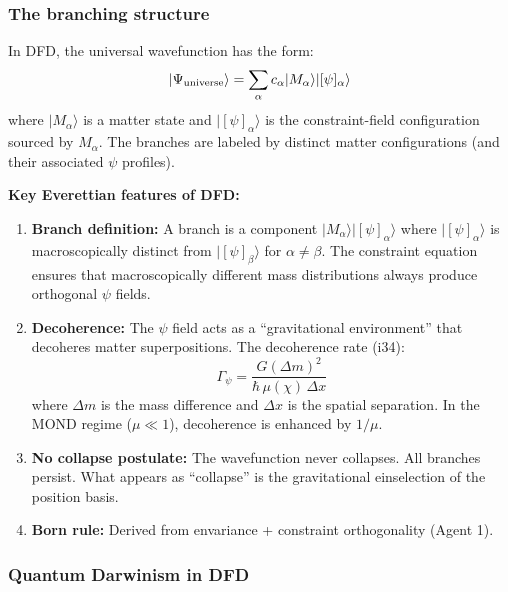 \documentclass[11pt,a4paper]{article}
\begin{document}
\subsubsection{The branching structure}

In DFD, the universal wavefunction has the form:
\begin{equation}
|\Psi_{\rm universe}\rangle = \sum_\alpha c_\alpha |M_\alpha\rangle |[\psi]_\alpha\rangle
\end{equation}
where $|M_\alpha\rangle$ is a matter state and $|[\psi]_\alpha\rangle$ is the constraint-field configuration sourced by $M_\alpha$. The branches are labeled by distinct matter configurations (and their associated $\psi$ profiles).

\textbf{Key Everettian features of DFD:}

\begin{enumerate}
\item \textbf{Branch definition:} A branch is a component $|M_\alpha\rangle|[\psi]_\alpha\rangle$ where $|[\psi]_\alpha\rangle$ is macroscopically distinct from $|[\psi]_\beta\rangle$ for $\alpha \neq \beta$. The constraint equation ensures that macroscopically different mass distributions always produce orthogonal $\psi$ fields.

\item \textbf{Decoherence:} The $\psi$ field acts as a ``gravitational environment'' that decoheres matter superpositions. The decoherence rate (i34):
\begin{equation}
\Gamma_\psi = \frac{G(\Delta m)^2}{\hbar\,\mu(\chi)\,\Delta x}
\end{equation}
where $\Delta m$ is the mass difference and $\Delta x$ is the spatial separation. In the MOND regime ($\mu \ll 1$), decoherence is enhanced by $1/\mu$.

\item \textbf{No collapse postulate:} The wavefunction never collapses. All branches persist. What appears as ``collapse'' is the gravitational einselection of the position basis.

\item \textbf{Born rule:} Derived from envariance + constraint orthogonality (Agent 1).
\end{enumerate}

\subsubsection{Quantum Darwinism in DFD}
\end{document}

